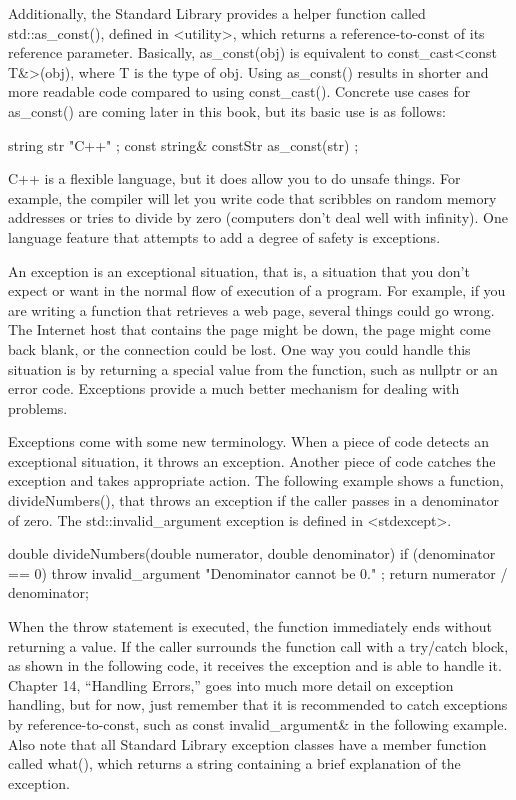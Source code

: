 Additionally, the Standard Library provides a helper function called std::as\_const(), defined in <utility>, which returns a reference-to-const of its reference parameter. Basically, as\_const(obj) is equivalent to const\_cast<const T\&>(obj), where T is the type of obj. Using as\_const() results in shorter and more readable code compared to using const\_cast(). Concrete use cases for as\_const() are coming later in this book, but its basic use is as follows:

\begin{cpp}
string str { "C++" };
const string& constStr { as_const(str) };
\end{cpp}


C++ is a flexible language, but it does allow you to do unsafe things. For example, the compiler will let you write code that scribbles on random memory addresses or tries to divide by zero (computers don’t deal well with infinity). One language feature that attempts to add a degree of safety is exceptions.

An exception is an exceptional situation, that is, a situation that you don’t expect or want in the normal flow of execution of a program. For example, if you are writing a function that retrieves a web page, several things could go wrong. The Internet host that contains the page might be down, the page might come back blank, or the connection could be lost. One way you could handle this situation is by returning a special value from the function, such as nullptr or an error code. Exceptions provide a much better mechanism for dealing with problems.

Exceptions come with some new terminology. When a piece of code detects an exceptional situation, it throws an exception. Another piece of code catches the exception and takes appropriate action. The following example shows a function, divideNumbers(), that throws an exception if the caller passes in a denominator of zero. The std::invalid\_argument exception is defined in <stdexcept>.

\begin{cpp}
double divideNumbers(double numerator, double denominator)
{
    if (denominator == 0) {
        throw invalid_argument { "Denominator cannot be 0." };
    }
    return numerator / denominator;
}
\end{cpp}

When the throw statement is executed, the function immediately ends without returning a value. If the caller surrounds the function call with a try/catch block, as shown in the following code, it receives the exception and is able to handle it. Chapter 14, “Handling Errors,” goes into much more detail on exception handling, but for now, just remember that it is recommended to catch exceptions by reference-to-const, such as const invalid\_argument\& in the following example. Also note that all Standard Library exception classes have a member function called what(), which returns a string containing a brief explanation of the exception.

